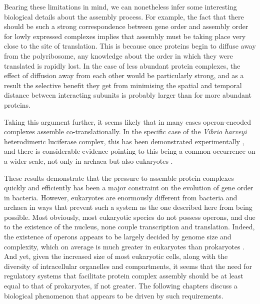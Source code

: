 \documentclass[a4paper,11pt,twoside,openright]{scrbook}
\begin{document}
Bearing these limitations in mind, we can nonetheless infer some interesting biological details about the assembly process. For example, the fact that there should be such a strong correspondence between gene order and assembly order for lowly expressed complexes implies that assembly must be taking place very close to the site of translation. This is because once proteins begin to diffuse away from the polyribosome, any knowledge about the order in which they were translated is rapidly lost. In the case of less abundant protein complexes, the effect of diffusion away from each other would be particularly strong, and as a result the selective benefit they get from minimising the spatial and temporal distance between interacting subunits is probably larger than for more abundant proteins.

Taking this argument further, it seems likely that in many cases operon-encoded complexes assemble co-translationally. In the specific case of the \textit{Vibrio harveyi} heterodimeric luciferase complex, this has been demonstrated experimentally \cite{Shieh2015a}, and there is considerable evidence pointing to this being a common occurrence on a wider scale, not only in archaea but also eukaryotes \cite{Duncan2011,Wells2015,Natan2017}.

These results demonstrate that the pressure to assemble protein complexes quickly and efficiently has been a major constraint on the evolution of gene order in bacteria. However, eukaryotes are enormously different from bacteria and archaea in ways that prevent such a system as the one described here from being possible. Most obviously, most eukaryotic species do not possess operons, and due to the existence of the nucleus, none couple transcription and translation. Indeed, the existence of operons appears to be largely decided by genome size and complexity, which on average is much greater in eukaryotes than prokaryotes \cite{Nunez2013}. And yet, given the increased size of most eukaryotic cells, along with the diversity of intracellular organelles and compartments, it seems that the need for regulatory systems that facilitate protein complex assembly should be at least equal to that of prokaryotes, if not greater. The following chapters discuss a biological phenomenon that appears to be driven by such requirements.

\end{document}
